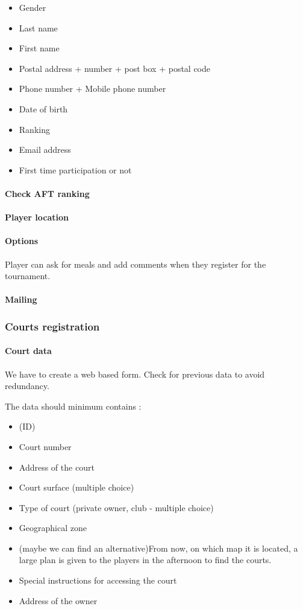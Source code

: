 \begin{itemize}
    \item Gender
    \item Last name
    \item First name
    \item Postal address + number + post box + postal code
    \item Phone number + Mobile phone number
    \item Date of birth
    \item Ranking
    \item Email address
    \item First time participation or not
\end{itemize}

\paragraph{Check AFT ranking}
\paragraph{Player location}
\paragraph{Options}

Player can ask for meals and add comments when they register for the
tournament.

\paragraph{Mailing}

\subsubsection{Courts registration}

\paragraph{Court data}

We have to create a web based form. Check for previous data to avoid
redundancy.

The data should minimum contains :

\begin{itemize}
    \item (ID)
    \item Court number
    \item Address of the court
    \item Court surface (multiple choice)
    \item Type of court (private owner, club - multiple choice)
    \item Geographical zone
    \item (maybe we can find an alternative)From now, on which map it is
        located, a large plan is given to the players in the afternoon
        to find the courts.
    \item Special instructions for accessing the court
    \item Address of the owner
\end{itemize}

